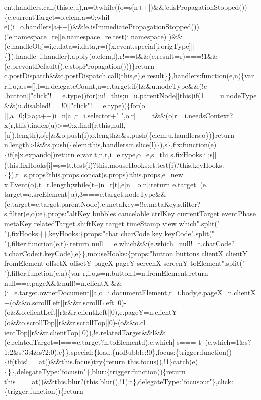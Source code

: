 \begin{DoxyCode}
{      ent.handlers.call(this,e,u),n=0;while((o=s[n++])&&!e.isPropagationStopped())\{e.currentTarget=o.elem,a=0;whil
      e((i=o.handlers[a++])&&!e.isImmediatePropagationStopped())(!e.namespace\_re||e.namespace\_re.test(i.namespace)
      )&&(e.handleObj=i,e.data=i.data,r=((x.event.special[i.origType]||\{\}).handle||i.handler).apply(o.elem,l),r!==t&&(e.result=r)===!1&&(e.preventDefault(),e.stopPropagation()))\}return
       c.postDispatch&&c.postDispatch.call(this,e),e.result\}\},handlers:function(e,n)\{var
       r,i,o,a,s=[],l=n.delegateCount,u=e.target;if(l&&u.nodeType&&(!e
      .button||"click"!==e.type))for(;u!=this;u=u.parentNode||this)if(1===u.nodeType&&(u.disabled!==!0||"click"!==e.type))\{for(o=[],a=0;l>a;a++)i=n[a],r=i.selector+"
       ",o[r]===t&&(o[r]=i.needsContext?x(r,this).index(u)>=0:x.find(r,this,null,[u]).length),o[r]&&o.push(i);o.length&&s.push(\{elem:u,handlers:o\})\}return
       n.length>l&&s.push(\{elem:this,handlers:n.slice(l)\}),s\},fix:function(e)\{if(e[x.expando])return e;var
       t,n,r,i=e.type,o=e,s=thi
      s.fixHooks[i];s||(this.fixHooks[i]=s=tt.test(i)?this.mouseHooks:et.test(i)?this.keyHooks:\{\}),r=s.props?this.props.concat(s.props):this.props,e=new x.Event(o),t=r.length;while(t--)n=r[t],e[n]=o[n];return
       e.target||(e.
      target=o.srcElement||a),3===e.target.nodeType&&(e.target=e.target.parentNode),e.metaKey=!!e.metaKey,s.filter?s.filter(e,o):e\},props:"altKey bubbles cancelable ctrlKey currentTarget eventPhase metaKey relatedTarget
       shiftKey target timeStamp view which".split(" "),fixHooks:\{\},keyHooks:\{props:"char charCode key
       keyCode".split(" "),filter:function(e,t)\{return
       null==e.which&&(e.which=null!=t.charCode?t.charCode:t.keyCode),e\}\},mouseHooks:\{props:"button buttons clientX clientY fromElement offsetX offsetY pageX pageY screenX screenY
       toElement".split(" "),filter:function(e,n)\{var r,i,o,s=n.button,l=n.fromElement;return
       null==e.pageX&&null!=n.clientX
      &&(i=e.target.ownerDocument||a,o=i.documentElement,r=i.body,e.pageX=n.clientX+(o&&o.scrollLeft||r&&r.scrollL
      eft||0)-(o&&o.clientLeft||r&&r.clientLeft||0),e.pageY=n.clientY+(o&&o.scrollTop||r&&r.scrollTop||0)-(o&&o.cl
      ientTop||r&&r.clientTop||0)),!e.relatedTarget&&l&&(e.relatedTarget=l===e.target?n.toElement:l),e.which||s===
      t||(e.which=1&s?1:2&s?3:4&s?2:0),e\}\},special:\{load:\{noBubble:!0\},focus:\{trigger:function()\{if(this!==at()&&this.focus)try\{return this.focus(),!1\}catch(e)\{\}\},delegateType:"focusin"\},blur:\{trigger:function()\{return
       this===at()&&this.blur?(this.blur(),!1):t\},delegateType:"focusout"\},click:\{trigger:function()\{return
}
\end{DoxyCode}
